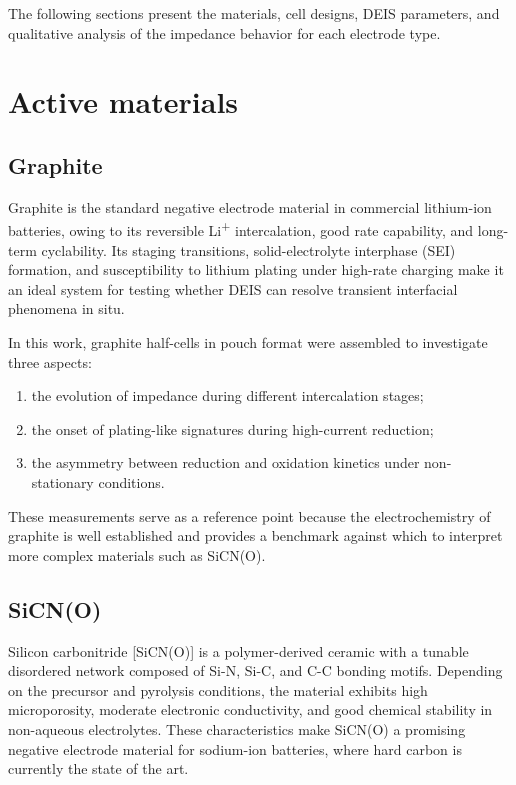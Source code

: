 The following sections present the materials, cell designs, DEIS parameters, and qualitative analysis of the impedance behavior for each electrode type.

\section{Active materials}

\subsection{Graphite}

Graphite is the standard negative electrode material in commercial lithium-ion batteries, owing to its reversible Li\textsuperscript{+} intercalation, good rate capability, and long-term cyclability.  
Its staging transitions, solid-electrolyte interphase (SEI) formation, and susceptibility to lithium plating under high-rate charging make it an ideal system for testing whether DEIS can resolve transient interfacial phenomena in situ.

In this work, graphite half-cells in pouch format were assembled to investigate three aspects:
\begin{enumerate}
    \item the evolution of impedance during different intercalation stages;
    \item the onset of plating-like signatures during high-current reduction;
    \item the asymmetry between reduction and oxidation kinetics under non-stationary conditions.
\end{enumerate}
These measurements serve as a reference point because the electrochemistry of graphite is well established and provides a benchmark against which to interpret more complex materials such as SiCN(O).

\subsection{SiCN(O)}

Silicon carbonitride [SiCN(O)] is a polymer-derived ceramic with a tunable disordered network composed of Si-N, Si-C, and C-C bonding motifs.  
Depending on the precursor and pyrolysis conditions, the material exhibits high microporosity, moderate electronic conductivity, and good chemical stability in non-aqueous electrolytes.  
These characteristics make SiCN(O) a promising negative electrode material for sodium-ion batteries, where hard carbon is currently the state of the art.

